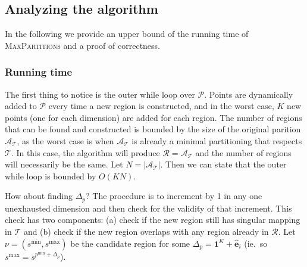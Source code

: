 \subsection{Analyzing the algorithm}%
\label{sub:maxPartsAnalysis}

In the following we provide an upper bound of the running time of
\textsc{MaxPartitions} and a proof of correctness.

\subsubsection{Running time}%
\label{sec:runningTime}

The first thing to notice is the outer while loop over $\mathcal{P}$. Points are
dynamically added to $\mathcal{P}$ every time a new region is constructed, and
in the worst case, $K$ new points (one for each dimension) are added for each
region. The number of regions that can be found and constructed is bounded by
the size of the original parition $\mathcal{A}_{\mathcal{T}}$, as the worst case
is when $\mathcal{A}_{\mathcal{T}}$ is already a minimal partitioning that
respects $\mathcal{T}$. In this case, the algorithm will produce $\mathcal{R} =
\mathcal{A}_{\mathcal{T}}$ and the number of regions will necessarily be the
same. Let $N = |\mathcal{A}_{\mathcal{T}}|$. Then we can state that the outer
while loop is bounded by $O(KN)$.


How about finding $\Delta_{p}$? The procedure is to increment by 1 in any one
unexhausted dimension and then check for the validity of that increment. This
check has two components: (a) check if the new region still has singular mapping
in $\mathcal{T}$ and (b) check if the new region overlaps with any region
already in $\mathcal{R}$. Let $\nu = (s^{\min}, s^{\max})$ be the candidate
region for some $\Delta_{p} = \mathbf{1}^{K} + \mathbf{\hat{e}}_{i}$ (ie.\ so
$s^{\max} = s^{p^{\min} + \Delta_{p}}$).

